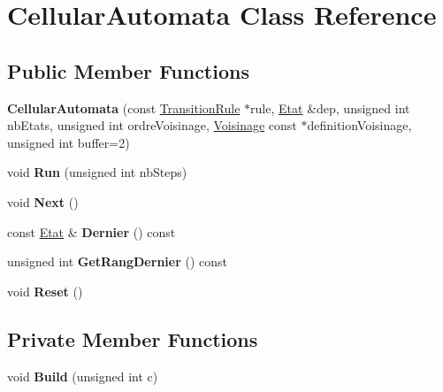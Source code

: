\hypertarget{class_cellular_automata}{}\section{Cellular\+Automata Class Reference}
\label{class_cellular_automata}
\subsection*{Public Member Functions}
\begin{DoxyCompactItemize}
\item 
\mbox{\label{class_cellular_automata_afc79d40dd2e2d2f99f7ceeaa756058a5}} 
{\bfseries Cellular\+Automata} (const \mbox{\hyperlink{class_transition_rule}{Transition\+Rule}} $\ast$rule, \mbox{\hyperlink{class_etat}{Etat}} \&dep, unsigned int nb\+Etats, unsigned int ordre\+Voisinage, \mbox{\hyperlink{class_voisinage}{Voisinage}} const $\ast$definition\+Voisinage, unsigned int buffer=2)
\item 
\mbox{\label{class_cellular_automata_aa704c475e0501f7db1f3bcb88211493a}} 
void {\bfseries Run} (unsigned int nb\+Steps)
\item 
\mbox{\label{class_cellular_automata_acfc9ced987c630324dcd70ceea348148}} 
void {\bfseries Next} ()
\item 
\mbox{\label{class_cellular_automata_a42291e2737e23c206e44f074d13323f7}} 
const \mbox{\hyperlink{class_etat}{Etat}} \& {\bfseries Dernier} () const
\item 
\mbox{\label{class_cellular_automata_a2c7e3542b8360a97f0166b5b75a11125}} 
unsigned int {\bfseries Get\+Rang\+Dernier} () const
\item 
\mbox{\label{class_cellular_automata_a0cbefb6072fea0aeb9458d81167c84d5}} 
void {\bfseries Reset} ()
\end{DoxyCompactItemize}
\subsection*{Private Member Functions}
\begin{DoxyCompactItemize}
\item 
\mbox{\label{class_cellular_automata_ac087053c4ed0f8989ea2016faa5fbae0}} 
void {\bfseries Build} (unsigned int c)
\end{DoxyCompactItemize}
